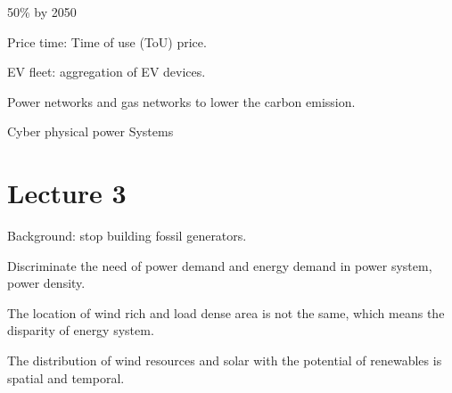 \documentclass{article}
\begin{document}
50\% by 2050

Price time: Time of use (ToU) price.

EV fleet: aggregation of EV devices.

Power networks and gas networks to lower the carbon emission.

Cyber physical power Systems

\newpage
\section{Lecture 3}

Background: stop building fossil generators. 

Discriminate the need of power demand and energy demand in power system, power density. 

The location of wind rich and load dense area is not the same, which means the disparity of energy system.

The distribution of wind resources and solar with the potential of renewables is spatial and temporal. 
\end{document}
